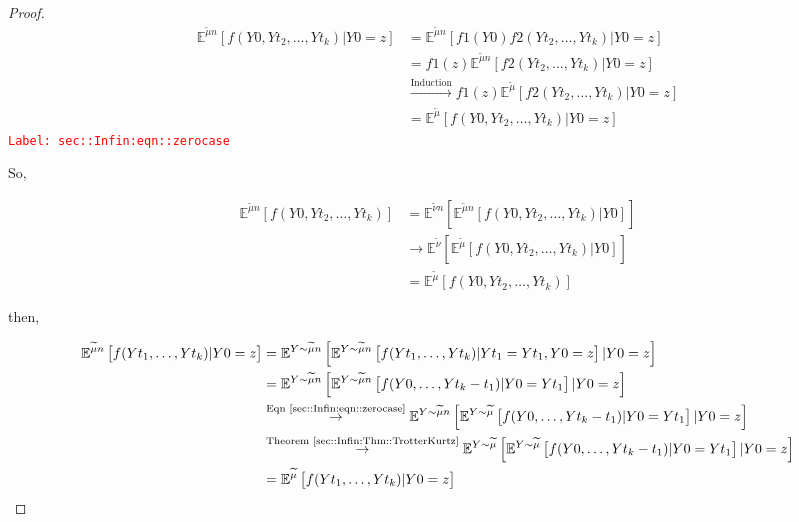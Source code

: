 \documentclass[12pt]{article}
\newcommand{\mb}{\mathbb}
\newcommand{\ra}{\rightarrow}
\newcommand{\os}{\overset}
\newcommand{\te}{\text}
\newcommand{\tr}{\textcolor{red}}
\newcommand{\labe}[1]{\tr{\texttt{Label: #1}}}
\newcommand{\exmu}[2]{\mb{E}^{#1}\left[#2\right]}	%
\renewcommand{\t}{t}							%
\newcommand{\alt}[1]{\widetilde{#1}}			%
\newcommand{\indx}[1]{_{#1}}					%
\newcommand{\m}{\mu}							%
\newcommand{\mm}{\nu}							%
\newcommand{\XX}{Y}								%
\renewcommand{\it}{k}							%
\newcommand{\xxx}{z}							%
\begin{document}
\begin{proof}
\begin{align}
\exmu{\alt{\m}{n}}{f(\XX{}{0},\XX{}{\t\indx{2}},\dots,\XX{}{\t\indx{\it}})|\XX{}{0} = \xxx}&= \exmu{\alt{\m}{n}}{f{1}(\XX{}{0})f{2}(\XX{}{\t\indx{2}},\dots,\XX{}{\t\indx{k}})|\XX{}{0}=\xxx}\nonumber\\
&= f{1}(\xxx)\exmu{\alt{\m}{n}}{f{2}(\XX{}{\t\indx{2}},\dots,\XX{}{\t\indx{k}})|\XX{}{0}=\xxx}\nonumber\\
&\os{\te{Induction}}{\ra} f{1}(\xxx)\exmu{\alt{\m}}{f{2}(\XX{}{\t\indx{2}},\dots,\XX{}{\t\indx{k}})|\XX{}{0}=\xxx}\nonumber\\
&= \exmu{\alt{\m}}{f(\XX{}{0},\XX{}{\t\indx{2}},\dots,\XX{}{\t\indx{\it}})|\XX{}{0}=\xxx}
\label{sec::Infin:eqn::zerocase}
\end{align}
\labe{sec::Infin:eqn::zerocase}

So,

\begin{align*}
\exmu{\alt{\m}{n}}{f(\XX{}{0},\XX{}{\t\indx{2}},\dots,\XX{}{\t\indx{\it}})} &= \exmu{\alt{\mm}{n}}{\exmu{\alt{\m}{n}}{f(\XX{}{0},\XX{}{\t\indx{2}},\dots,\XX{}{\t\indx{\it}})|\XX{}{0}}}\\
&\ra \exmu{\alt{\mm}}{\exmu{\alt{\m}}{f(\XX{}{0},\XX{}{\t\indx{2}},\dots,\XX{}{\t\indx{\it}})|\XX{}{0}}}\\
&= \exmu{\alt{\m}}{f(\XX{}{0},\XX{}{\t\indx{2}},\dots,\XX{}{\t\indx{\it}})}
\end{align*}

then,

\begin{align*}
\exmu{\alt{\m}{n}}{f(\XX{}{\t\indx{1}},\dots,\XX{}{\t\indx{\it}})|\XX{}{0}=\xxx}&=\exmu{\XX\sim\alt{\m}{n}}{\exmu{\XX\sim \alt{\m}{n}}{f(\XX{\t\indx{1}},\dots,\XX{\t\indx{\it}})|\XX{\t\indx{1}}=\XX{}{\t\indx{1}},\XX{0}=\xxx}|\XX{}{0}=\xxx}\\
&=\exmu{\XX\sim\alt{\m}{n}}{\exmu{\XX\sim \alt{\m}{n}}{f(\XX{0},\dots,\XX{\t\indx{\it}-\t\indx{1}})|\XX{0}=\XX{}{\t\indx{1}}}|\XX{}{0}=\xxx}\\
&\os{\te{Eqn \eqref{sec::Infin:eqn::zerocase}}}{\ra} \exmu{\XX\sim\alt{\m}{n}}{\exmu{\XX\sim \alt{\m}}{f(\XX{0},\dots,\XX{\t\indx{\it}-\t\indx{1}})|\XX{0}=\XX{}{\t\indx{1}}}|\XX{}{0}=\xxx}\\
&\os{\te{Theorem \ref{sec::Infin:Thm::TrotterKurtz}}}{\ra} \exmu{\XX\sim\alt{\m}}{\exmu{\XX\sim \alt{\m}}{f(\XX{0},\dots,\XX{\t\indx{\it}-\t\indx{1}})|\XX{0}=\XX{}{\t\indx{1}}}|\XX{}{0}=\xxx}\\
&=\exmu{\alt{\m}}{f(\XX{}{\t\indx{1}},\dots,\XX{}{\t\indx{\it}})|\XX{}{0}=\xxx}
\end{align*}


\end{proof}
\end{document}
